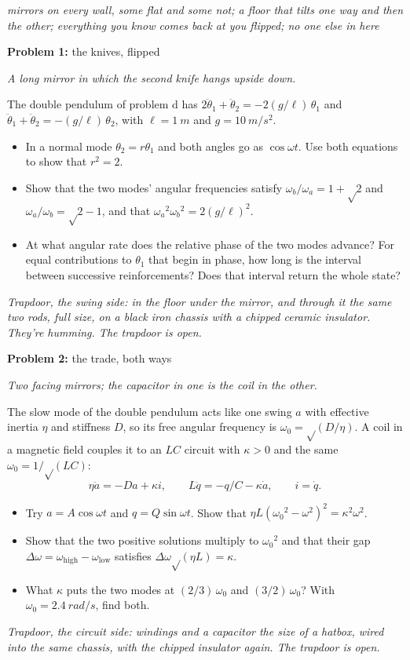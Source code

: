 \documentclass[11pt]{article}
\newcommand{\scene}[1]{\par{\itshape #1}\par}
\newcommand{\problem}[2]{\par\medskip\textbf{Problem #1:} #2\par\nopagebreak}
\newcommand{\appx}[2]{\clearpage{\Large\bfseries Appendix #1: #2}\par\medskip}
\newenvironment{parts}{\begin{itemize}[leftmargin=3.4em,labelwidth=2.8em,labelsep=0.6em,align=left,itemsep=2pt,topsep=3pt]}{\end{itemize}}
\newcommand{\pt}[1]{\item[\textbf{#1}]}
\newcommand{\rt}{\text{√}}  %
\begin{document}
\appx{2}{the funhouse}
\scene{mirrors on every wall, some flat and some not; a floor that tilts one way and then the other; everything you know comes back at you flipped; no one else in here}

\problem{1}{the knives, flipped}
\scene{A long mirror in which the second knife hangs upside down.}
The double pendulum of problem d has $2\ddot\theta_1 + \ddot\theta_2 = -2(g/\ell)\,\theta_1$ and $\ddot\theta_1 + \ddot\theta_2 = -(g/\ell)\,\theta_2$, with $\ell = \SI{1}{m}$ and $g = \SI{10}{m/s^2}$.
\begin{parts}
\pt{1-$\alpha$} In a normal mode $\theta_2 = r\theta_1$ and both angles go as $\cos\omega t$. Use both equations to show that $r^2 = 2$.
\pt{1-$\beta$} Show that the two modes' angular frequencies satisfy $\omega_b/\omega_a = 1 + \rt2$ and $\omega_a/\omega_b = \rt2 - 1$, and that $\omega_a{}^2\omega_b{}^2 = 2(g/\ell)^2$.
\pt{1-$\gamma$} At what angular rate does the relative phase of the two modes advance? For equal contributions to $\theta_1$ that begin in phase, how long is the interval between successive reinforcements? Does that interval return the whole state?
\end{parts}
\scene{Trapdoor, the swing side: in the floor under the mirror, and through it the same two rods, full size, on a black iron chassis with a chipped ceramic insulator. They're humming. The trapdoor is open.}

\problem{2}{the trade, both ways}
\scene{Two facing mirrors; the capacitor in one is the coil in the other.}
The slow mode of the double pendulum acts like one swing $a$ with effective inertia $\eta$ and stiffness $D$, so its free angular frequency is $\omega_0 = \rt(D/\eta)$. A coil in a magnetic field couples it to an $LC$ circuit with $\kappa > 0$ and the same $\omega_0 = 1/\rt(LC)$:
\[ \eta\ddot a = -Da + \kappa i, \qquad L\ddot q = -q/C - \kappa\dot a, \qquad i = \dot q. \]
\begin{parts}
\pt{2-$\alpha$} Try $a = A\cos\omega t$ and $q = Q\sin\omega t$. Show that $\eta L(\omega_0{}^2 - \omega^2)^2 = \kappa^2\omega^2$.
\pt{2-$\beta$} Show that the two positive solutions multiply to $\omega_0{}^2$ and that their gap $\Delta\omega = \omega_{\mathrm{high}} - \omega_{\mathrm{low}}$ satisfies $\Delta\omega\rt(\eta L) = \kappa$.
\pt{2-$\gamma$} What $\kappa$ puts the two modes at $(2/3)\,\omega_0$ and $(3/2)\,\omega_0$? With $\omega_0 = \SI{2.4}{rad/s}$, find both.
\end{parts}
\scene{Trapdoor, the circuit side: windings and a capacitor the size of a hatbox, wired into the same chassis, with the chipped insulator again. The trapdoor is open.}
\end{document}

